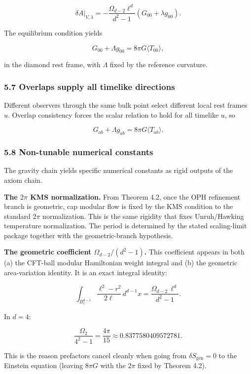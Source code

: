 \[
\delta A|_{V,\lambda} = -\frac{\Omega_{d-2} \ell^d}{d^2 - 1} (G_{00} + \lambda g_{00}).
\]

The equilibrium condition yields

\[
G_{00} + \Lambda g_{00} = 8 \pi G \langle T_{00} \rangle,
\]

in the diamond rest frame, with \(\Lambda\) fixed by the reference curvature.

\subsubsection{5.7 Overlaps supply all timelike directions}\label{57-overlaps-supply-all-timelike-directions}

Different observers through the same bulk point select different local rest frames \(u\). Overlap consistency forces the scalar relation to hold for all timelike \(u\), so

\[
G_{ab} + \Lambda g_{ab} = 8 \pi G \langle T_{ab} \rangle.
\]

\subsubsection{5.8 Non-tunable numerical constants}\label{58-non-tunable-numerical-constants}

The gravity chain yields specific numerical constants as rigid outputs of the axiom chain.

\textbf{The \(2\pi\) KMS normalization.} From Theorem 4.2, once the OPH refinement branch is geometric, cap modular flow is fixed by the KMS condition to the standard \(2\pi\) normalization. This is the same rigidity that fixes Unruh/Hawking temperature normalization. The period is determined by the stated scaling-limit package together with the geometric-branch hypothesis.

\textbf{The geometric coefficient \(\Omega_{d-2}/(d^2 - 1)\).} This coefficient appears in both (a) the CFT-ball modular Hamiltonian weight integral and (b) the geometric area-variation identity. It is an exact integral identity:

\[
\int_{B^{d-1}_\ell} \frac{\ell^2 - r^2}{2\ell} \, d^{d-1}x
= \frac{\Omega_{d-2} \, \ell^d}{d^2 - 1}.
\]

In \(d = 4\):

\[
\frac{\Omega_2}{4^2 - 1} = \frac{4\pi}{15} \approx 0.8377580409572781.
\]

This is the reason prefactors cancel cleanly when going from \(\delta S_{\mathrm{gen}} = 0\) to the Einstein equation (leaving \(8\pi G\) with the \(2\pi\) fixed by Theorem 4.2).

